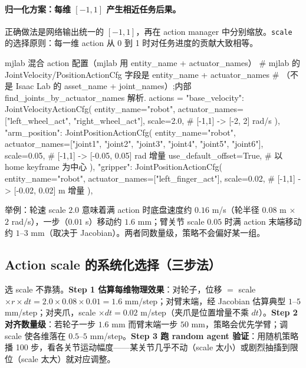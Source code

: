 \paragraph{归一化方案：每维 $[-1,1]$ 产生相近任务后果。}正确做法是网络输出统一的 $[-1,1]$，再在 action manager 中分别缩放。\verb|scale| 的选择原则：每一维 action 从 0 到 1 时对任务进度的贡献大致相等。

\begin{codebox}[Python]{mjlab 混合 action 配置（mjlab 用 entity\_name + actuator\_names）}
# mjlab 的 JointVelocity/PositionActionCfg 字段是 entity_name + actuator_names
# （不是 Isaac Lab 的 asset_name + joint_names）;内部 find_joints_by_actuator_names 解析.
actions = {
    "base_velocity": JointVelocityActionCfg(
        entity_name="robot",
        actuator_names=["left_wheel_act", "right_wheel_act"],
        scale=2.0,                 # [-1,1] -> [-2, 2] rad/s
    ),
    "arm_position": JointPositionActionCfg(
        entity_name="robot",
        actuator_names=["joint1", "joint2", "joint3", "joint4", "joint5", "joint6"],
        scale=0.05,                # [-1,1] -> [-0.05, 0.05] rad 增量
        use_default_offset=True,   # 以 home keyframe 为中心
    ),
    "gripper": JointPositionActionCfg(
        entity_name="robot",
        actuator_names=["left_finger_act"],
        scale=0.02,                # [-1,1] -> [-0.02, 0.02] m 增量
    ),
}
\end{codebox}

举例：轮速 scale $2.0$ 意味着满 action 时底盘速度约 $0.16$ m/s（轮半径 $0.08$ m $\times$ $2$ rad/s），一步（$0.01$ s）移动约 $1.6$ mm；臂关节 scale $0.05$ 时满 action 末端移动约 $1$--$3$ mm（取决于 Jacobian）。两者同数量级，策略不会偏好某一组。

\subsection{Action scale 的系统化选择（三步法）}
\label{sec:rlmc-wh-scale}

选 scale 不靠猜。\textbf{Step 1 估算每维物理效果}：对轮子，位移 $=$ scale $\times r\times dt=2.0\times0.08\times0.01=1.6$ mm/step；对臂末端，经 Jacobian 估算典型 $1$--$5$ mm/step；对夹爪，scale $\times dt=0.02$ m/step（夹爪是位置增量不乘 $dt$）。\textbf{Step 2 对齐数量级}：若轮子一步 $1.6$ mm 而臂末端一步 $50$ mm，策略会优先学臂；调 scale 使各维落在 $0.5$--$5$ mm/step。\textbf{Step 3 跑 random agent 验证}：用随机策略播 100 步，看各关节运动幅度——某关节几乎不动（scale 太小）或剧烈抽搐到限位（scale 太大）就对应调整。


